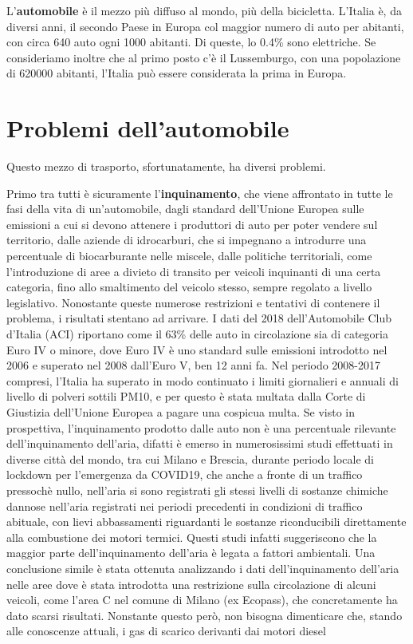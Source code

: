 L'\textbf{automobile} è il mezzo più diffuso al mondo, più della bicicletta. L'Italia è, da diversi anni, il secondo Paese in Europa col maggior numero di auto per abitanti, con circa 640 auto ogni 1000 abitanti\cite{eurostatcars}. Di queste, lo 0.4\% sono elettriche\cite{anfiastudiestatistiche}. Se consideriamo inoltre che al primo posto c'è il Lussemburgo, con una popolazione di 620000 abitanti, l'Italia può essere considerata la prima in Europa. 

\section{Problemi dell'automobile}

Questo mezzo di trasporto, sfortunatamente, ha diversi problemi.

Primo tra tutti è sicuramente l'\textbf{inquinamento}, che viene affrontato in tutte le fasi della vita di un'automobile, dagli standard dell'Unione Europea sulle emissioni a cui si devono attenere i produttori di auto per poter vendere sul territorio, dalle aziende di idrocarburi, che si impegnano a introdurre una percentuale di biocarburante nelle miscele, dalle politiche territoriali, come l'introduzione di aree a divieto di transito per veicoli inquinanti di una certa categoria, fino allo smaltimento del veicolo stesso, sempre regolato a livello legislativo. Nonostante queste numerose restrizioni e tentativi di contenere il problema, i risultati stentano ad arrivare. I dati del 2018 dell'Automobile Club d'Italia (ACI) riportano come il 63\% delle auto in circolazione sia di categoria Euro IV o minore\cite{anfiastudiestatistiche}, dove Euro IV è uno standard sulle emissioni introdotto nel 2006 e superato nel 2008 dall'Euro V, ben 12 anni fa\cite{euroivstandard}. Nel periodo 2008-2017 compresi, l'Italia ha superato in modo continuato i limiti giornalieri e annuali di livello di polveri sottili PM10, e per questo è stata multata dalla Corte di Giustizia dell'Unione Europea a pagare una cospicua multa\cite{eunewssanzioneitalia}. Se visto in prospettiva, l'inquinamento prodotto dalle auto non è una percentuale rilevante dell'inquinamento dell'aria, difatti è emerso in numerosissimi studi effettuati in diverse città del mondo, tra cui Milano e Brescia\cite{collivignarelli2020}\cite{camaletti2020}, durante periodo locale di lockdown per l'emergenza da COVID19, che anche a fronte di un traffico pressochè nullo, nell'aria si sono registrati gli stessi livelli di sostanze chimiche dannose nell'aria registrati nei periodi precedenti in condizioni di traffico abituale, con lievi abbassamenti riguardanti le sostanze riconducibili direttamente alla combustione dei motori termici. Questi studi infatti suggeriscono che la maggior parte dell'inquinamento dell'aria è legata a fattori ambientali. Una conclusione simile è stata ottenuta analizzando i dati dell'inquinamento dell'aria nelle aree dove è stata introdotta una restrizione sulla circolazione di alcuni veicoli, come l'area C nel comune di Milano (ex Ecopass), che concretamente ha dato scarsi risultati\cite{trentini2014}. Nonstante questo però, non bisogna dimenticare che, stando alle conoscenze attuali, i gas di scarico derivanti dai motori diesel 